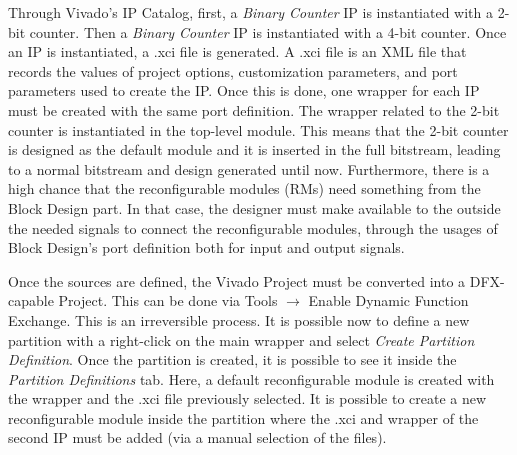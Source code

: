 Through Vivado's IP Catalog, first, a \textit{Binary Counter} IP is instantiated with a 2-bit counter. Then a \textit{Binary Counter} IP is instantiated with a 4-bit counter. Once an IP is instantiated, a .xci file is generated. A .xci file is an XML file that records the values of project options, customization parameters, and port parameters used to create the IP. Once this is done, one wrapper for each IP must be created with the same port definition. The wrapper related to the 2-bit counter is instantiated in the top-level module. This means that the 2-bit counter is designed as the default module and it is inserted in the full bitstream, leading to a normal bitstream and design generated until now. Furthermore, there is a high chance that the reconfigurable modules (RMs) need something from the Block Design part. In that case, the designer must make available to the outside the needed signals to connect the reconfigurable modules, through the usages of Block Design's port definition both for input and output signals. \bigskip



Once the sources are defined, the Vivado Project must be converted into a DFX-capable Project. This can be done via Tools $\rightarrow$ Enable Dynamic Function Exchange. This is an irreversible process. It is possible now to define a new partition with a right-click on the main wrapper and select \textit{Create Partition Definition}. Once the partition is created, it is possible to see it inside the \textit{Partition Definitions} tab. Here, a default reconfigurable module is created with the wrapper and the .xci file previously selected. It is possible to create a new reconfigurable module inside the partition where the .xci and wrapper of the second IP must be added (via a manual selection of the files).

